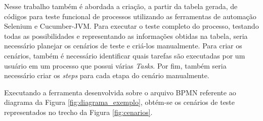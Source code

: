 \documentclass[12pt]{article}
\begin{document}
\begin{table}[]
\centering
\caption{Tabela obtida através do arquivo BPMN}
\label{tab:resultado}
\end{table}

Nesse trabalho também é abordada a criação, a partir da tabela gerada, de códigos para teste funcional de processos utilizando as ferramentas de automação Selenium e Cucumber-JVM. Para executar o teste completo do processo, testando todas as possibilidades e representando as informações obtidas na tabela, seria necessário planejar os cenários de teste e criá-los manualmente. Para criar os cenários, também é necessário identificar quais tarefas são executadas por um usuário em um processo que possui várias \emph{Tasks}. Por fim, também seria necessário criar os \emph{steps} para cada etapa do cenário manualmente.

Executando a ferramenta desenvolvida sobre o arquivo BPMN referente ao diagrama da Figura \ref{fig:diagrama_exemplo}, obtém-se os cenários de teste representados no trecho da Figura \ref{fig:cenarios}. 
\end{document}
